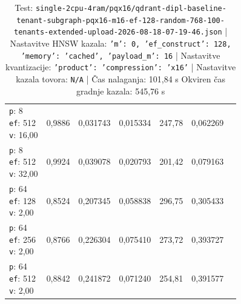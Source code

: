 \begin{table}[htbp]
\begin{tabularx}{\textwidth}{Xrrrrrr}
    \makecell{\texttt{p}: 8\\\texttt{ef}: 512\\\texttt{v}: 16,00} & 0,9886 & 0,031743 & 0,015334 & 247,78 & 0,062269 \\
    \makecell{\texttt{p}: 8\\\texttt{ef}: 512\\\texttt{v}: 32,00} & 0,9924 & 0,039078 & 0,020793 & 201,42 & 0,079163 \\
    \makecell{\texttt{p}: 64\\\texttt{ef}: 128\\\texttt{v}: 2,00} & 0,8524 & 0,207345 & 0,058838 & 296,75 & 0,305433 \\
    \makecell{\texttt{p}: 64\\\texttt{ef}: 256\\\texttt{v}: 2,00} & 0,8766 & 0,226304 & 0,075410 & 273,72 & 0,393727 \\
    \makecell{\texttt{p}: 64\\\texttt{ef}: 512\\\texttt{v}: 2,00} & 0,8842 & 0,241872 & 0,071240 & 254,81 & 0,391577 \\
    \bottomrule
  \end{tabularx}
\caption* {Test: \texttt{single-2cpu-4ram/pqx16/qdrant-dipl-baseline-tenant-subgraph-pqx16-m16-ef-128-random-768-100-tenants-extended-upload-2026-08-18-07-19-46.json} | Nastavitve HNSW kazala: \texttt{{'m': 0, 'ef\_construct': 128, 'memory': 'cached', 'payload\_m': 16}} | Nastavitve kvantizacije: \texttt{{'product': {'compression': 'x16'}}} | Nastavitve kazala tovora: \texttt{N/A} | Čas nalaganja: 101,84 s Okviren čas gradnje kazala: 545,76 s}\end{table}


